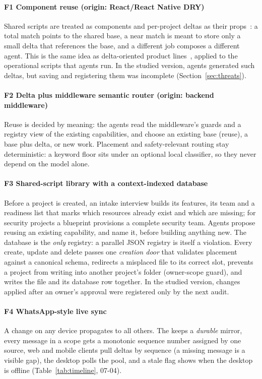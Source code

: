 \paragraph*{F1 Component reuse (origin: React/React Native DRY)} Shared scripts are treated as components and per-project deltas as their props~\cite{react,mcilroy1968components}: a total match points to the shared base, a near match is meant to store only a small delta that references the base, and a different job composes a different agent. This is the same idea as delta-oriented product lines~\cite{schaefer2010delta}, applied to the operational scripts that agents run. In the studied version, agents generated such deltas, but saving and registering them was incomplete (Section~\ref{sec:threats}).

\paragraph*{F2 Delta plus middleware semantic router (origin: backend middleware)} Reuse is decided by meaning: the agents read the middleware's guards and a registry view of the existing capabilities, and choose an existing base (reuse), a base plus delta, or new work. Placement and safety-relevant routing stay deterministic: a keyword floor sits under an optional local classifier, so they never depend on the model alone.

\paragraph*{F3 Shared-script library with a context-indexed database} Before a project is created, an intake interview builds its features, its team and a readiness list that marks which resources already exist and which are missing; for security projects a blueprint provisions a complete security team. Agents propose reusing an existing capability, and name it, before building anything new. The database is the \emph{only} registry: a parallel JSON registry is itself a violation. Every create, update and delete passes one \emph{creation door} that validates placement against a canonical schema, redirects a misplaced file to its correct slot, prevents a project from writing into another project's folder (owner-scope guard), and writes the file and its database row together. In the studied version, changes applied after an owner's approval were registered only by the next audit.

\paragraph*{F4 WhatsApp-style live sync} A change on any device propagates to all others. The \hub{} keeps a \emph{durable} mirror, every message in a scope gets a monotonic sequence number assigned by one source, web and mobile clients pull deltas by sequence (a missing message is a visible gap), the desktop polls the pool, and a stale flag shows when the desktop is offline (Table~\ref{tab:timeline}, 07-04).


